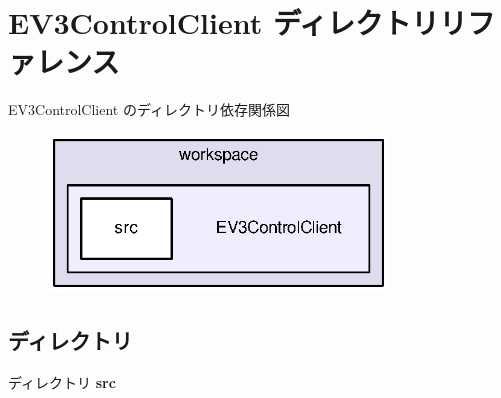 \section{E\-V3\-Control\-Client ディレクトリリファレンス}
\label{dir_4c288b4294462ace490dd5a7120a1848}
E\-V3\-Control\-Client のディレクトリ依存関係図
\nopagebreak
\begin{figure}[H]
\begin{center}
\leavevmode
\includegraphics[width=256pt]{dir_4c288b4294462ace490dd5a7120a1848_dep}
\end{center}
\end{figure}
\subsection*{ディレクトリ}
\begin{DoxyCompactItemize}
\item 
ディレクトリ {\bf src}
\end{DoxyCompactItemize}
